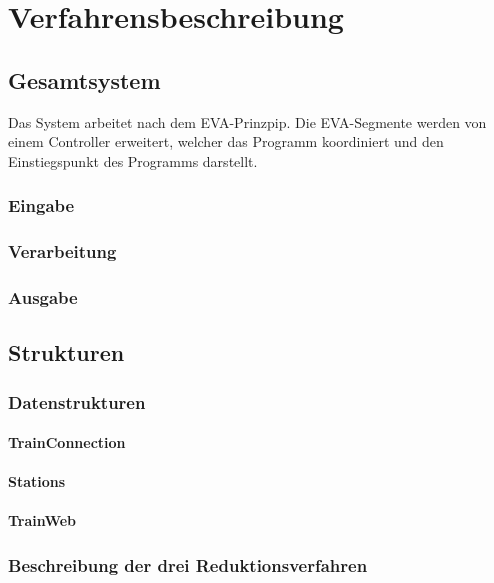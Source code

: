 \chapter{Verfahrensbeschreibung}\label{ch:verfahrensbeschreibung}


\section{Gesamtsystem}\label{sec:gesamtsystem}
Das System arbeitet nach dem EVA-Prinzpip. Die EVA-Segmente werden von einem Controller erweitert, welcher das Programm koordiniert und den Einstiegspunkt des Programms darstellt.

\subsection{Eingabe}\label{subsec:eingabe}

\subsection{Verarbeitung}\label{subsec:verarbeitung}
\subsection{Ausgabe}\label{subsec:ausgabe}

\section{Strukturen}\label{sec:strukturen}
\subsection{Datenstrukturen}\label{subsec:datenstrukt}
\subsubsection{TrainConnection}\label{subsubsec:trainconnection}
\subsubsection{Stations}\label{subsubsec:stations}
\subsubsection{TrainWeb}\label{subsubsec:trainweb}

\subsection{Beschreibung der drei Reduktionsverfahren}
